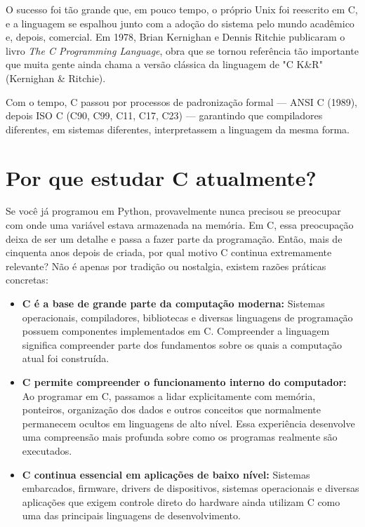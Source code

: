 \documentclass[12pt,a4paper,oneside]{extreport}
\begin{document}
O sucesso foi tão grande que, em pouco tempo, o próprio Unix foi reescrito em C, e a linguagem se espalhou junto com a adoção do sistema pelo mundo acadêmico e, depois, comercial. Em 1978, Brian Kernighan e Dennis Ritchie publicaram o livro \textit{The C Programming Language}, obra que se tornou referência tão importante que muita gente ainda chama a versão clássica da linguagem de "C K\&R" (Kernighan \& Ritchie).

Com o tempo, C passou por processos de padronização formal — ANSI C (1989), depois ISO C (C90, C99, C11, C17, C23) — garantindo que compiladores diferentes, em sistemas diferentes, interpretassem a linguagem da mesma forma.

\section{Por que estudar C atualmente?}

Se você já programou em Python, provavelmente nunca precisou se preocupar com onde uma variável estava armazenada na memória. Em C, essa preocupação deixa de ser um detalhe e passa a fazer parte da programação. Então, mais de cinquenta anos depois de criada, por qual motivo C continua extremamente relevante? 
Não é apenas por tradição ou nostalgia, existem razões práticas concretas:


\begin{itemize}
    \item[--] \textbf{C é a base de grande parte da computação moderna:} Sistemas operacionais, compiladores, bibliotecas e diversas linguagens de programação possuem componentes implementados em C. Compreender a linguagem significa compreender parte dos fundamentos sobre os quais a computação atual foi construída.
    \item[--] \textbf{C permite compreender o funcionamento interno do computador:} Ao programar em C, passamos a lidar explicitamente com memória, ponteiros, organização dos dados e outros conceitos que normalmente permanecem ocultos em linguagens de alto nível. Essa experiência desenvolve uma compreensão mais profunda sobre como os programas realmente são executados.
    \item[--] \textbf{C continua essencial em aplicações de baixo nível:} Sistemas embarcados, firmware, drivers de dispositivos, sistemas operacionais e diversas aplicações que exigem controle direto do hardware ainda utilizam C como uma das principais linguagens de desenvolvimento.
\end{itemize}
\end{document}
